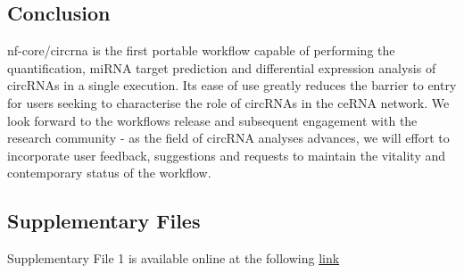 \subsection{Conclusion}
nf-core/circrna is the first portable workflow capable of performing the quantification, miRNA target prediction and differential expression analysis of circRNAs in a single execution. Its ease of use greatly reduces the barrier to entry for users seeking to characterise the role of circRNAs in the ceRNA network. We look forward to the workflows release and subsequent engagement with the research community - as the field of circRNA analyses advances, we will effort to incorporate user feedback, suggestions and requests to maintain the vitality and contemporary status of the workflow. 

\subsection{Supplementary Files}
\hypertarget{chp2suppfile1}{}

Supplementary File 1 is available online at the following \href{https://link.springer.com/article/10.1186/s12859-022-05125-8#Sec16}{link}
